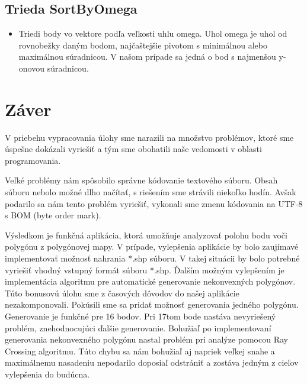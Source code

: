 \documentclass[12pt]{article}
\begin{document}
\subsection{Trieda SortByOmega}
\begin{itemize}
\item Triedi body vo vektore podľa veľkosti uhlu omega. Uhol omega je uhol od rovnobežky daným bodom, najčaštejšie pivotom s minimálnou alebo maximálnou súradnicou. V našom prípade sa jedná o bod s najmenšou y-onovou súradnicou.
\end{itemize}

\section{Záver}
V priebehu vypracovania úlohy sme narazili na množstvo problémov, ktoré sme úspešne dokázali vyriešiť a tým sme obohatili naše vedomosti v oblasti programovania.

Veľké problémy nám spôsobilo správne kódovanie textového súboru. Obsah súboru nebolo možné dlho načítať, s riešením sme strávili niekoľko hodín. Avšak podarilo sa nám tento problém vyriešiť, vykonali sme zmenu kódovania na UTF-8 s BOM (byte order mark).

Výsledkom je funkčná aplikácia, ktorá umožňuje analyzovať polohu bodu voči polygónu z polygónovej mapy. V prípade, vylepšenia aplikácie by bolo zaujímavé implementovať možnosť nahrania *.shp súboru. V takej situácii by bolo potrebné vyriešiť vhodný vstupný formát súboru *.shp. Ďalším možným vylepšením je implementácia algoritmu pre automatické generovanie nekonvexných polygónov. Túto bonusovú úlohu sme z časových dôvodov do našej aplikácie nezakomponovali. Pokúsili sme sa pridať možnosť generovania jedného polygónu. Generovanie je funkčné pre 16 bodov. Pri 17tom bode nastáva nevyriešený problém, znehodnocujúci ďalšie generovanie. Bohužiaľ po implementovaní generovania nekonvexného polygónu nastal problém pri analýze pomocou Ray Crossing algoritmu. Túto chybu sa nám bohužiaľ aj napriek veľkej snahe a maximálnemu nasadeniu nepodarilo doposiaľ odstrániť a zostáva jedným z cieľov vylepšenia do budúcna.
\nocite{*}
{}

    
\end{document}
